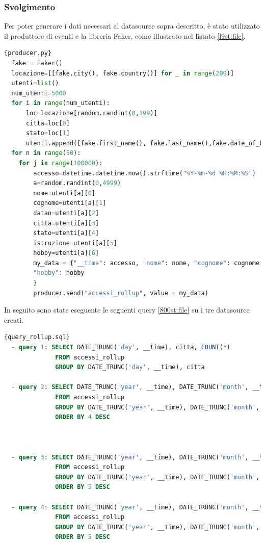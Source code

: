 \subsubsection{Svolgimento}
Per poter generare i dati necessari al \gls{datasource}{} sopra descritto, 
è stato utilizzato il produttore di eventi e la libreria \gls{Faker}{}, come illustrato nel listato \ref{l9st:file}.
\begin{lstlisting}[language=Python, caption=\texttt{producer\_rollup.py}, label=l9st:file]{producer.py}
  fake = Faker()
  locazione=[[fake.city(), fake.country()] for _ in range(200)]
  utenti=list()
  num_utenti=5000
  for i in range(num_utenti):
      loc=locazione[random.randint(0,199)]
      citta=loc[0]
      stato=loc[1]
      utenti.append([fake.first_name(), fake.last_name(),fake.date_of_birth(minimum_age=18, maximum_age=89).strftime("%Y-%m-%d"), citta, stato, fake.random_element(elements=("Scuola Secondaria", "Laurea triennale", "Laurea Magistrale", "Dottorato")), fake.random_element(elements=("Leggere","Viaggiare","Giocare a calcio","Giocare ai videogiochi","Fare sport")) ] )
  for n in range(50):
    for j in range(100000):
        accesso=datetime.datetime.now().strftime("%Y-%m-%d %H:%M:%S")
        a=random.randint(0,4999)
        nome=utenti[a][0]
        cognome=utenti[a][1]
        datan=utenti[a][2]
        citta=utenti[a][3]
        stato=utenti[a][4]
        istruzione=utenti[a][5]
        hobby=utenti[a][6]
        my_data = {"__time": accesso, "nome": nome, "cognome": cognome, "datan":  datan, "citta": citta, "stato": stato, "istruzione": istruzione,
        "hobby": hobby
        }
        producer.send("accessi_rollup", value = my_data) 
    \end{lstlisting}
In seguito sono state eseguente le seguenti query \ref{800st:file} su i tre \gls{datasource}{} creati.
\begin{lstlisting}[language=SQL, caption=\texttt{query\_rollup.sql}, label=800st:file]{query_rollup.sql}
  - query 1: SELECT DATE_TRUNC('day', __time), citta, COUNT(*)
              FROM accessi_rollup
              GROUP BY DATE_TRUNC('day', __time), citta
              
  - query 2: SELECT DATE_TRUNC('year', __time), DATE_TRUNC('month', __time), stato, COUNT(*)
              FROM accessi_rollup
              GROUP BY DATE_TRUNC('year', __time), DATE_TRUNC('month', __time), stato
              ORDER BY 4 DESC
  


  - query 3: SELECT DATE_TRUNC('year', __time), DATE_TRUNC('month', __time), DATE_TRUNC('day', __time), stato, citta, COUNT(*) 
              FROM accessi_rollup
              GROUP BY DATE_TRUNC('year', __time), DATE_TRUNC('month', __time), DATE_TRUNC('day', __time), stato, citta
              ORDER BY 5 DESC
  
  - query 4: SELECT DATE_TRUNC('year', __time), DATE_TRUNC('month', __time), DATE_TRUNC('day', __time), DATE_TRUNC('hour', __time), stato, citta, COUNT(*) 
              FROM accessi_rollup
              GROUP BY DATE_TRUNC('year', __time), DATE_TRUNC('month', __time), DATE_TRUNC('day', __time), DATE_TRUNC('hour', __time), stato, citta
              ORDER BY 5 DESC
  \end{lstlisting}
